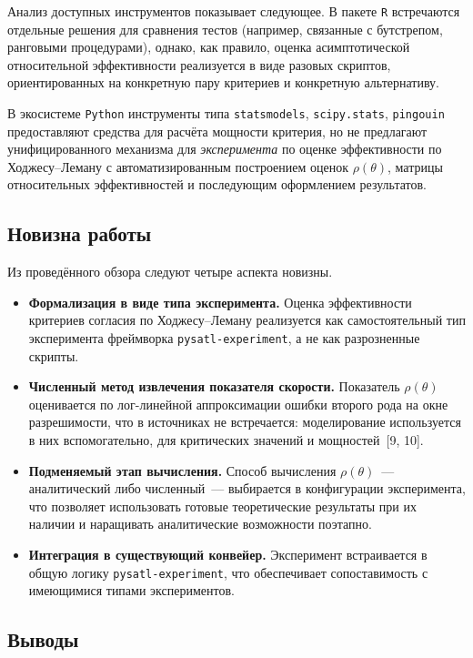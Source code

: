 Анализ доступных инструментов показывает следующее. В пакете \texttt{R} встречаются
отдельные решения для сравнения тестов (например, связанные с бутстрепом, ранговыми процедурами),
однако, как правило, оценка асимптотической относительной эффективности реализуется в виде
разовых скриптов, ориентированных на конкретную пару критериев и конкретную альтернативу.

В экосистеме \texttt{Python} инструменты типа \texttt{statsmodels}, \texttt{scipy.stats},
\texttt{pingouin} предоставляют средства для расчёта мощности критерия, но не предлагают
унифицированного механизма для \emph{эксперимента} по оценке эффективности по Ходжесу--Леману
с автоматизированным построением оценок $\rho(\theta)$, матрицы относительных эффективностей и
последующим оформлением результатов.

\subsection{Новизна работы}
\label{ssec:novelty}

Из проведённого обзора следуют четыре аспекта новизны.

\begin{itemize}
  \item \textbf{Формализация в виде типа эксперимента.} Оценка эффективности критериев
        согласия по Ходжесу--Леману реализуется как самостоятельный тип эксперимента
        фреймворка \texttt{pysatl-experiment}, а не как разрозненные скрипты.
  \item \textbf{Численный метод извлечения показателя скорости.} Показатель $\rho(\theta)$
        оценивается по лог-линейной аппроксимации ошибки второго рода на окне разрешимости,
        что в источниках не встречается: моделирование используется в них вспомогательно,
        для критических значений и мощностей~[9, 10].
  \item \textbf{Подменяемый этап вычисления.} Способ вычисления $\rho(\theta)$~---
        аналитический либо численный~--- выбирается в конфигурации эксперимента, что
        позволяет использовать готовые теоретические результаты при их наличии и наращивать
        аналитические возможности поэтапно.
  \item \textbf{Интеграция в существующий конвейер.} Эксперимент встраивается в общую
        логику \texttt{pysatl-experiment}, что обеспечивает
        сопоставимость с имеющимися типами экспериментов.
\end{itemize}

\subsection{Выводы}
\label{ssec:conclusions}

